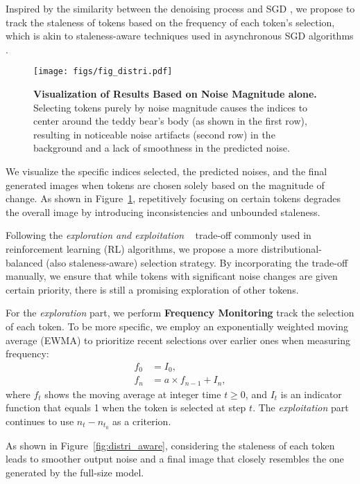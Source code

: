 \documentclass[10pt]{article}
\begin{document}
Inspired by the similarity between the denoising process and SGD \citep{Bottou2010LargeScaleML}, we propose to track the staleness of tokens based on the frequency of each token's selection, which is akin to staleness-aware techniques used in asynchronous SGD algorithms \citep{Dean2012LargeSD,Zhang2015StalenessAwareAF,Zheng2016AsynchronousSG}.

\begin{figure}[h]
    \centering
    \texttt{[image: figs/fig\_distri.pdf]}
    \caption{\textbf{Visualization of Results Based on Noise Magnitude alone.} Selecting tokens purely by noise magnitude causes the indices to center around the teddy bear’s body (as shown in the first row), resulting in noticeable noise artifacts (second row) in the background and a lack of smoothness in the predicted noise.}
    \label{fig:distri}
\end{figure}
We visualize the specific indices selected, the predicted noises, and the final generated images when tokens are chosen solely based on the magnitude of change. As shown in Figure~\ref{fig:distri}, repetitively focusing on certain tokens degrades the overall image by introducing inconsistencies and unbounded staleness. 

Following the \textit{exploration and exploitation} ~\citep{Auer2002FinitetimeAO,Sutton1998ReinforcementLA} trade-off commonly used in reinforcement learning (RL) algorithms, we propose a more distributional-balanced (also staleness-aware) selection strategy. By incorporating the trade-off manually, we ensure that while tokens with significant noise changes are given certain priority, there is still a promising exploration of other tokens.


For the \textit{exploration} part, we perform \textbf{Frequency Monitoring} track the selection of each token. To be more specific, we employ an exponentially weighted moving average (EWMA) to prioritize recent selections over earlier ones when measuring frequency:
    \begin{align}
        f_0 &= I_0, \\
        f_n &= a \times f_{n-1} + I_n,
    \end{align}
    where \( f_t \) shows the moving average at integer time \( t \geq 0 \), and \( I_t \) is an indicator function that equals 1 when the token is selected at step \( t \).
The \textit{exploitation} part continues to use $n_t- n_{t_{0}}$ as a criterion.




As shown in Figure~\ref{fig:distri_aware}, considering the staleness of each token leads to smoother output noise and a final image that closely resembles the one generated by the full-size model.
\end{document}

